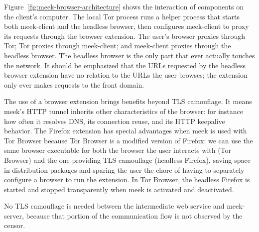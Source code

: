 \documentclass{sig-alternate}
\newcommand{\meekclient}{\mbox{meek-client}\xspace}
\newcommand{\meekserver}{\mbox{meek-server}\xspace}
\newcommand{\meek}{meek\xspace}
\begin{document}
Figure~\ref{fig:meek-browser-architecture} shows the interaction of components
on the client's computer.
The local Tor process runs a helper process that starts both \meekclient
and the headless browser,
then configures \meekclient to proxy its requests through the browser extension.
The user's browser proxies through Tor;
Tor proxies through \meekclient;
and \meekclient proxies through the headless browser.
The headless browser is the only part that ever actually touches the network.
It should be emphasized that the URLs requested by the headless browser extension
have no relation to the URLs the user browses;
the extension only ever makes requests to the front domain.

The use of a browser extension brings benefits beyond TLS camouflage.
It means \meek's HTTP tunnel inherits other characteristics of the browser:
for instance
how often it resolves DNS,
its connection reuse,
and its HTTP keepalive behavior.
The Firefox extension has special advantages
when \meek is used with Tor Browser
because Tor Browser
is a modified version of Firefox:
we can use the same browser executable for both the browser the user interacts with (Tor Browser)
and the one providing TLS camouflage (headless Firefox),
saving space in distribution packages
and sparing the user the chore of having to separately configure a browser to run the extension.
In Tor Browser,
the headless Firefox is started and stopped transparently
when \meek is activated and deactivated.


No TLS camouflage is needed between the intermediate web service and \meekserver,
because that portion of the communication flow is not observed by the censor.

\end{document}
